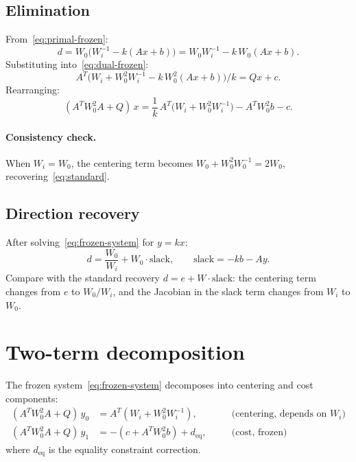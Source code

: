 \documentclass{article}
\begin{document}
\subsection{Elimination}

From~\eqref{eq:primal-frozen}:
\[
  d = W_0\bigl(W_i^{-1} - k(Ax + b)\bigr)
    = W_0 W_i^{-1} - k\,W_0(Ax + b).
\]
Substituting into~\eqref{eq:dual-frozen}:
\[
  A^T\!\bigl(W_i + W_0^2 W_i^{-1} - k\,W_0^2(Ax+b)\bigr)/k = Qx + c.
\]
Rearranging:
\begin{equation}\label{eq:frozen-system}
  \boxed{
  (A^T W_0^2 A + Q)\, x
  = \frac{1}{k}\,A^T\!\bigl(W_i + W_0^2 W_i^{-1}\bigr)
    - A^T W_0^2 b - c.
  }
\end{equation}

\paragraph{Consistency check.}
When $W_i = W_0$, the centering term becomes
$W_0 + W_0^2 W_0^{-1} = 2W_0$, recovering~\eqref{eq:standard}.

\subsection{Direction recovery}

After solving~\eqref{eq:frozen-system} for $y = kx$:
\begin{equation}\label{eq:d-recovery}
  d = \frac{W_0}{W_i} + W_0 \cdot \text{slack},
  \qquad \text{slack} = -kb - Ay.
\end{equation}
Compare with the standard recovery $d = e + W \cdot \text{slack}$:
the centering term changes from $e$ to $W_0/W_i$, and the Jacobian
in the slack term changes from $W_i$ to $W_0$.

\section{Two-term decomposition}

The frozen system~\eqref{eq:frozen-system} decomposes into centering and
cost components:
\begin{align}
  (A^T W_0^2 A + Q)\,y_0 &= A^T(W_i + W_0^2 W_i^{-1}),
    &\quad &\text{(centering, depends on $W_i$)} \label{eq:rhs0}\\
  (A^T W_0^2 A + Q)\,y_1 &= -(c + A^T W_0^2 b) + d_{\text{eq}},
    &\quad &\text{(cost, frozen)} \label{eq:rhs1}
\end{align}
where $d_{\text{eq}}$ is the equality constraint correction.
\end{document}
